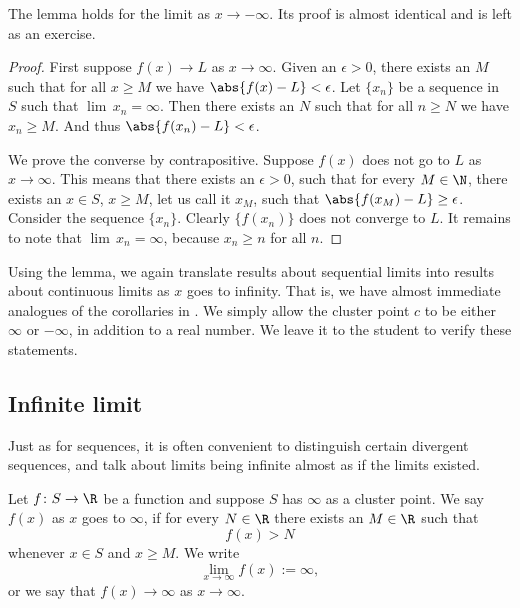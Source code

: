 \documentclass[12pt]{book}
\begin{document}
The lemma holds for the limit as $x \to -\infty$.
Its proof is almost identical and
is left as an exercise.

\begin{proof}
First suppose $f(x) \to L$ as $x \to \infty$.
Given an $\epsilon > 0$, there exists an $M$ such that for all $x \geq M$
we have $\abs{f(x)-L} < \epsilon$.
Let $\{ x_n \}$
be a sequence in $S$ such that $\lim \, x_n = \infty$.
Then there exists an
$N$ such that for all $n \geq N$ we have $x_n \geq M$.
And thus
$\abs{f(x_n)-L} < \epsilon$.

We prove the converse by contrapositive.
Suppose $f(x)$ does
not go to $L$ as $x \to \infty$.
This means that there exists an $\epsilon > 0$,
such that for every $M \in \N$, there exists an $x \in S$, $x \geq M$, let
us call it $x_M$, such that $\abs{f(x_M)-L} \geq \epsilon$.
Consider the sequence $\{ x_n \}$.
Clearly 
$\{ f(x_n) \}$ does not converge to $L$.
It remains to note
that $\lim\, x_n = \infty$, because $x_n \geq n$ for all $n$.
\end{proof}

Using the lemma, we again translate results about sequential
limits into results about continuous limits as $x$ goes to infinity.
That
is, we have almost immediate analogues of the corollaries
in .
We simply allow 
the cluster point $c$ to be either $\infty$ or $-\infty$, in addition
to a real number.
We leave it to
the student to verify these statements.

\subsection*{Infinite limit}

Just as for sequences, it is often convenient to distinguish certain
divergent sequences, and talk about limits being infinite
almost as if the limits existed.

\begin{defn}
%
Let $f \colon S \to \R$ be a function and suppose 
$S$ has $\infty$ as a cluster point.
We say $f(x)$
\emph{} 
as $x$ goes to $\infty$,
if for every $N \in \R$
there exists an $M \in \R$ such that
\begin{equation*}
f(x) > N
\end{equation*}
whenever $x \in S$ and $x \geq M$.
We write
\begin{equation*}
\lim_{x \to \infty} f(x) := \infty ,
\end{equation*}
or we say that $f(x) \to \infty$ as $x \to \infty$.
\end{defn}
\end{document}
